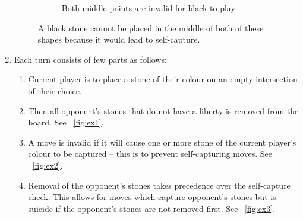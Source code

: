 \documentclass{l4proj}
\begin{document}
\begin{enumerate}
\begin{figure}[!ht]
\begin{subfigure}[t]{0.3\textwidth}
  \caption{Both middle points are invalid for black to play}
  \label{fig:ex2-1}
  \end{subfigure}
  \caption{A black stone cannot be placed in the middle of both of these shapes because it would lead to self-capture.}
  \label{fig:ex2}
  \end{figure}

  \item Each turn consists of few parts as follows:
  	\begin{enumerate}[label={(\alph*)}]
		\item Current player is to place a stone of their colour on an empty intersection of their choice.
		\item Then all opponent’s stones that do not have a liberty is removed from the board. See ~\autoref{fig:ex1}.
		\item A move is invalid if it will cause one or more stone of the current player’s colour to be captured – this is to prevent self-capturing moves. See ~\autoref{fig:ex2}.
		\item Removal of the opponent’s stones takes precedence over the self-capture check. This allows for moves which capture opponent’s stones but is suicide if the opponent’s stones are not removed first. See ~\autoref{fig:ex3}.
	\end{enumerate}


\end{enumerate}
\end{document}
